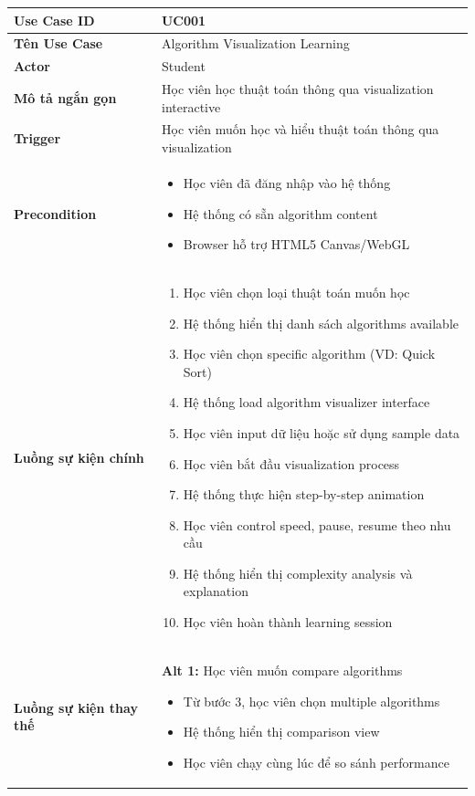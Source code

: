 \begin{longtable}{| p{3cm} | p{10cm} |}
\hline
\textbf{Use Case ID} & UC001 \\ \hline
\textbf{Tên Use Case} & Algorithm Visualization Learning \\ \hline
\textbf{Actor} & Student \\ \hline
\textbf{Mô tả ngắn gọn} & Học viên học thuật toán thông qua visualization interactive \\ \hline
\textbf{Trigger} & Học viên muốn học và hiểu thuật toán thông qua visualization \\ \hline
\textbf{Precondition} & 
\begin{itemize}
    \item Học viên đã đăng nhập vào hệ thống
    \item Hệ thống có sẵn algorithm content
    \item Browser hỗ trợ HTML5 Canvas/WebGL
\end{itemize} \\ \hline
\textbf{Luồng sự kiện chính} & 
\begin{enumerate}
    \item Học viên chọn loại thuật toán muốn học
    \item Hệ thống hiển thị danh sách algorithms available
    \item Học viên chọn specific algorithm (VD: Quick Sort)
    \item Hệ thống load algorithm visualizer interface
    \item Học viên input dữ liệu hoặc sử dụng sample data
    \item Học viên bắt đầu visualization process
    \item Hệ thống thực hiện step-by-step animation
    \item Học viên control speed, pause, resume theo nhu cầu
    \item Hệ thống hiển thị complexity analysis và explanation
    \item Học viên hoàn thành learning session
\end{enumerate} \\ \hline
\textbf{Luồng sự kiện thay thế} & 
\textbf{Alt 1:} Học viên muốn compare algorithms
\begin{itemize}
    \item Từ bước 3, học viên chọn multiple algorithms
    \item Hệ thống hiển thị comparison view
    \item Học viên chạy cùng lúc để so sánh performance

\end{itemize}
\end{longtable}
